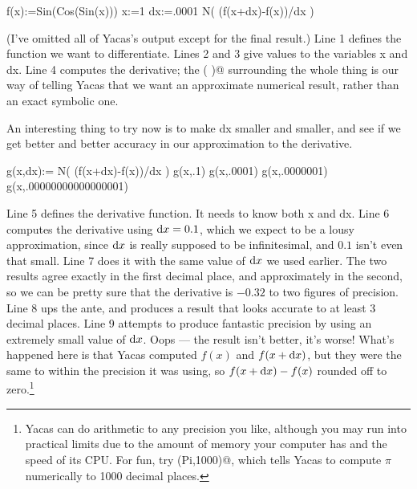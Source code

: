 \restartLineNumbers
\begin{eg}
\startcodeeg
\begin{Code}
  \nn f(x):=Sin(Cos(Sin(x)))
  \nn x:=1
  \nn dx:=.0001
  \nn N( (f(x+dx)-f(x))/dx )
\end{Code}
\finishcodeeg
\end{eg}


(I've omitted all of Yacas's output except for the final result.)
Line 1 defines the function we want to differentiate. Lines 2 and
3 give values to the variables x and dx. Line 4 computes the derivative;
the \verb@N( )@ surrounding the whole thing is our way of telling Yacas
that we want an approximate numerical result, rather than an exact symbolic one.

An interesting thing to try now is to make dx smaller and smaller, and see if
we get better and better accuracy in our approximation to the derivative.

\begin{eg}\label{eg:derivative-limit}
\startcodeeg
\begin{Code}
  \nn g(x,dx):= 
  \cc N( (f(x+dx)-f(x))/dx )
  \nn g(x,.1)
  \nn g(x,.0001)
  \nn g(x,.0000001)
  \nn g(x,.00000000000000001)
\end{Code}
\end{eg}

Line 5 defines the derivative function. It needs to know both x and dx. Line
6 computes the derivative using $\operatorname{d\!} x=0.1$, which we expect to be a lousy approximation,
since $\operatorname{d\!} x$ is really supposed to be infinitesimal, and $0.1$ isn't even that small.
Line 7 does it with the same value of $\operatorname{d\!} x$ we used earlier. The two results agree
exactly in the first decimal place, and approximately in the second, so we can be
pretty sure that the derivative is $-0.32$ to two figures of precision. Line 8
ups the ante, and produces a result that looks accurate to at least 3 decimal places.
Line 9 attempts to produce fantastic precision by using an extremely small value of $\operatorname{d\!} x$.
Oops --- the result isn't better, it's worse! What's happened here is that Yacas
computed $f(x)$ and $f(x+\operatorname{d\!} x)$, but they were the same to within the precision it
was using, so $f(x+\operatorname{d\!} x)-f(x)$ rounded off to zero.\footnote{Yacas can do arithmetic
to any precision you like, although you may run into practical limits due to the amount
of memory your computer has and the speed of its CPU. For fun, try \verb@N(Pi,1000)@,
which tells Yacas to compute $\pi$ numerically to 1000 decimal places.}

